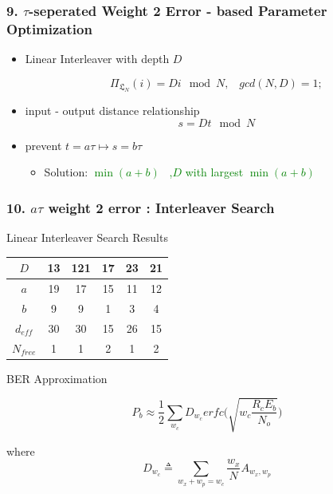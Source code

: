 \documentclass{beamer}  %
\begin{document}

\begin{frame}
\frametitle{9. $\tau$-seperated Weight 2 Error - based Parameter Optimization}

\begin{itemize}
\item Linear Interleaver with depth $D$

\begin{equation}
 \Pi_{\mathfrak{L}_N}(i) = Di \mod N,\,\,\,\,\, gcd(N,D)=1;
\end{equation}

\item input - output distance relationship
 \begin{equation} 
 s = Dt \mod N
 \label{cong}
 \end{equation}
 
 \item prevent $t=a\tau \mapsto s=b\tau$
 
\begin{itemize}
\item Solution: \textcolor{green}{$\min{ (a+b)}$ \,\,\,,$D$ with largest $\min{ (a+b)}$} 


\end{itemize}
\end{itemize}

\end{frame}


\begin{frame}
\frametitle{10. $a\tau$ weight 2 error : Interleaver Search}
\begin{block}{Linear Interleaver Search Results}
\begin{table}[h!]
\centering
\begin{tabular}{||c |c |c |c |c |c ||} 
 \hline
 $D$ & 13 & 121 & 17 & 23 & 21\\ [0.5ex] 
 \hline\hline
 $a $ & 19 & 17 & 15 & 11 & 12 \\ 
 \hline
  $b $ & 9 & 9 & 1 & 3 & 4 \\ 
  \hline
  $d_{eff} $ & 30 & 30 & 15 & 26 & 15 \\ 
  \hline
  $N_{free}$ & 1 & 1 & 2 & 1 & 2 \\ [1ex] 
 \hline
\end{tabular}
\label{tab1}
\end{table}
\end{block}

\begin{block}{ BER Approximation}


\begin{equation} 
 P_b \approx \frac{1}{2}\sum_{w_c}D_{w_c} 
  erfc \Bigg(\sqrt{w_c\frac{R_cE_b}{N_o}} \Bigg)
  \label{aprox}
  \end{equation}
  
 where 
  $$ D_{w_c}\triangleq \sum_{w_x+w_p=w_c} \frac{w_x}{N}A_{w_x,w_p}$$
\end{block}
\end{frame}
\end{document}
